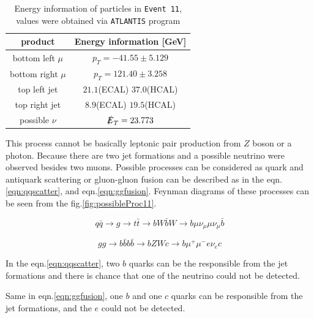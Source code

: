 \begin{table}[h]
		\centering
        \begin{tabular}{cc}
            \toprule
             product & Energy information [GeV]  \\
            \midrule
            bottom left $\mu$ & $p_T = -41.55 \pm 5.129$  \\
  			\midrule
  			bottom right $\mu$ & $p_T = 121.40 \pm 3.258$   \\
  			\midrule
  			top left jet & $ 21.1$(ECAL)  $ 37.0$(HCAL) \\
  			\midrule
  			top right jet & $ 8.9$(ECAL)  $ 19.5$(HCAL) \\
  			\midrule
  			possible $\nu$ & $\slashed{E}_T = 23.773$ \\
			\bottomrule
        \end{tabular}
        \caption{Energy information of particles in \texttt{Event 11}, values were obtained via \texttt{ATLANTIS} program}
        \label{tab:event11}
    \end{table}
\FloatBarrier

This process cannot be basically leptonic pair production from $Z$ boson or a photon. Because there are two jet formations and a possible neutrino were observed besides two muons. Possible processes can be considered as quark and antiquark scattering or gluon-gluon fusion can be described as in the eqn.\ref{eqn:qqscatter}, and eqn.\ref{eqn:ggfusion}. Feynman diagrams of these processes can be seen from the fig.\ref{fig:possibleProc11}.

\begin{equation}
	q\bar{q} \rightarrow g \rightarrow t\bar{t} \rightarrow bW\bar{b}W \rightarrow b\mu\nu_\mu\mu\nu_\mu\bar{b}
	\label{eqn:qqscatter}
\end{equation}

\begin{equation}
	gg \rightarrow b\bar{b}b\bar{b} \rightarrow bZWc \rightarrow b\mu^+\mu^-e\nu_ec
	\label{eqn:ggfusion}
\end{equation}

In the eqn.\ref{eqn:qqscatter}, two $b$ quarks can be the responsible from the jet formations and there is chance that one of the neutrino could not be detected.

Same in eqn.\ref{eqn:ggfusion}, one $b$ and one $c$ quarks can be responsible from the jet formations, and the $e$ could not be detected.

